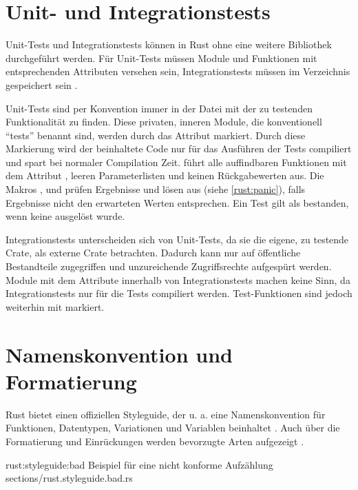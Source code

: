 \section{Unit- und Integrationstests}
\label{rust:tests}

Unit-Tests und Integrationstests können in Rust ohne eine weitere Bibliothek durchgeführt werden.
Für Unit-Tests müssen Module und Funktionen mit entsprechenden Attributen versehen sein, Integrationstests müssen im Verzeichnis  gespeichert sein \cite{rust:book:tests}.

Unit-Tests sind per Konvention immer in der Datei mit der zu testenden Funktionalität zu finden.
Diese privaten, inneren Module, die konventionell \enquote{tests} benannt sind, werden durch das Attribut  markiert.
Durch diese Markierung wird der beinhaltete Code nur für das Ausführen der Tests compiliert und spart bei normaler Compilation Zeit.
 führt alle auffindbaren Funktionen mit dem Attribut \rustcinline{#[test]}, leeren Parameterlisten und keinen Rückgabewerten aus.
Die Makros ,  und  prüfen Ergebnisse und lösen  aus (siehe \autoref{rust:panic}), falls Ergebnisse nicht den erwarteten Werten entsprechen.
Ein Test gilt als bestanden, wenn keine  ausgelöst wurde.

Integrationstests unterscheiden sich von Unit-Tests, da sie die eigene, zu testende Crate, als externe Crate betrachten.
Dadurch kann nur auf öffentliche Bestandteile zugegriffen und unzureichende Zugriffsrechte aufgespürt werden.
Module mit dem Attribute  innerhalb von Integrationstests machen keine Sinn, da Integrationstests nur für die Tests compiliert werden.
Test-Funktionen sind jedoch weiterhin mit \rustcinline{#[test]} markiert.


\section{Namenskonvention und Formatierung}
\label{rust:styleguide}

Rust bietet einen offiziellen Styleguide, der u. a. eine Namenskonvention für Funktionen, Datentypen, Variationen und Variablen beinhaltet \cite{rust:styleguide:naming}.
Auch über die Formatierung und Einrückungen werden bevorzugte Arten aufgezeigt \cite{rust:styleguide}.

\rustcinclude
	{rust:styleguide:bad}
	{Beispiel für eine nicht konforme Aufzählung}
	{sections/rust.styleguide.bad.rs}

